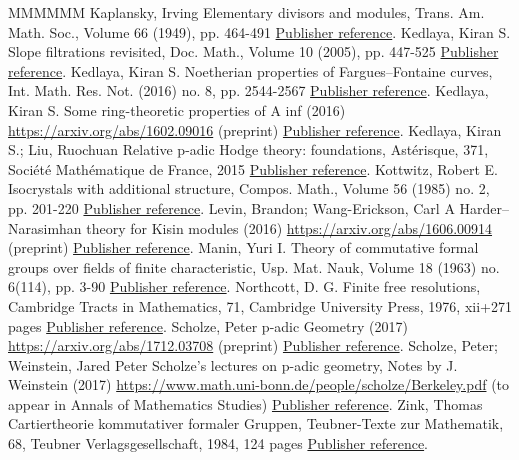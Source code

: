 \documentclass[11pt]{article}
\theoremstyle{definition}
\numberwithin{equation}{section}
\numberwithin{figure}{section}
\numberwithin{table}{section}
\begin{document}
\begin{thebibliography}{MMMMMM}
 Kaplansky, Irving Elementary divisors and modules, Trans. Am. Math. Soc., Volume 66 (1949), pp. 464-491 \href{https://ahl.centre-mersenne.org/item/AHL_2019__2__415_0/#Ka66}{Publisher reference}.
 Kedlaya, Kiran S. Slope filtrations revisited, Doc. Math., Volume 10 (2005), pp. 447-525 \href{https://ahl.centre-mersenne.org/item/AHL_2019__2__415_0/#Ke05}{Publisher reference}.
 Kedlaya, Kiran S. Noetherian properties of Fargues–Fontaine curves, Int. Math. Res. Not. (2016) no. 8, pp. 2544-2567 \href{https://ahl.centre-mersenne.org/item/AHL_2019__2__415_0/#Ke16}{Publisher reference}.
 Kedlaya, Kiran S. Some ring-theoretic properties of A inf  (2016) \url{https://arxiv.org/abs/1602.09016} (preprint) \href{https://ahl.centre-mersenne.org/item/AHL_2019__2__415_0/#Ke16b}{Publisher reference}.
 Kedlaya, Kiran S.; Liu, Ruochuan Relative p-adic Hodge theory: foundations, Astérisque, 371, Société Mathématique de France, 2015 \href{https://ahl.centre-mersenne.org/item/AHL_2019__2__415_0/#KeLi15}{Publisher reference}.
 Kottwitz, Robert E. Isocrystals with additional structure, Compos. Math., Volume 56 (1985) no. 2, pp. 201-220 \href{https://ahl.centre-mersenne.org/item/AHL_2019__2__415_0/#Ko85}{Publisher reference}.
 Levin, Brandon; Wang-Erickson, Carl A Harder–Narasimhan theory for Kisin modules (2016) \url{https://arxiv.org/abs/1606.00914} (preprint) \href{https://ahl.centre-mersenne.org/item/AHL_2019__2__415_0/#LeWE16}{Publisher reference}.
 Manin, Yuri I. Theory of commutative formal groups over fields of finite characteristic, Usp. Mat. Nauk, Volume 18 (1963) no. 6(114), pp. 3-90 \href{https://ahl.centre-mersenne.org/item/AHL_2019__2__415_0/#Ma63}{Publisher reference}.
 Northcott, D. G. Finite free resolutions, Cambridge Tracts in Mathematics, 71, Cambridge University Press, 1976, xii+271 pages \href{https://ahl.centre-mersenne.org/item/AHL_2019__2__415_0/#No76}{Publisher reference}.
 Scholze, Peter p-adic Geometry (2017) \url{https://arxiv.org/abs/1712.03708} (preprint) \href{https://ahl.centre-mersenne.org/item/AHL_2019__2__415_0/#Sc17}{Publisher reference}.
 Scholze, Peter; Weinstein, Jared Peter Scholze’s lectures on p-adic geometry, Notes by J. Weinstein (2017) \url{https://www.math.uni-bonn.de/people/scholze/Berkeley.pdf} (to appear in Annals of Mathematics Studies) \href{https://ahl.centre-mersenne.org/item/AHL_2019__2__415_0/#ScWe15}{Publisher reference}.
 Zink, Thomas Cartiertheorie kommutativer formaler Gruppen, Teubner-Texte zur Mathematik, 68, Teubner Verlagsgesellschaft, 1984, 124 pages \href{https://ahl.centre-mersenne.org/item/AHL_2019__2__415_0/#Zi84}{Publisher reference}.
\end{thebibliography}
\end{document}
